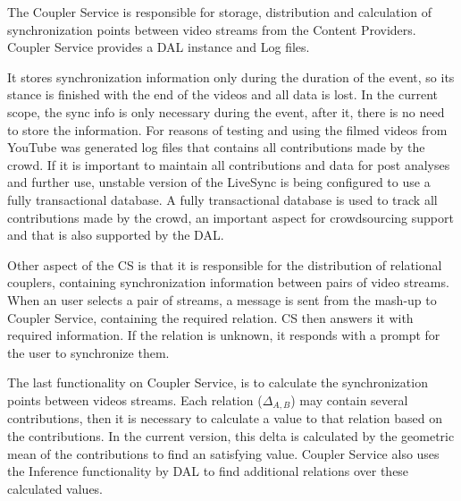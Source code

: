 The Coupler Service is responsible for storage, distribution and calculation of synchronization points between video streams from the Content Providers. Coupler Service provides a DAL instance and Log files. 







It stores synchronization information only during the duration of the event, so its stance is finished with the end of the videos and all data is lost. In the current scope, the sync info is only necessary during the event, after it, there is no need to store the information. For reasons of testing and using the filmed videos from YouTube was generated log files that contains all contributions made by the crowd. If it is important to maintain all contributions and data for post analyses and further use, unstable version of the LiveSync is being configured to use a fully transactional database.  A fully transactional database is used to track all contributions made by the crowd, an important aspect for crowdsourcing support and that is also supported by the DAL.

Other aspect of the CS is that it is responsible for the distribution of relational couplers, containing synchronization information between pairs of video streams. When an user selects a pair of streams, a message is sent from the mash-up to Coupler Service, containing the required relation. CS then answers it with required information. If the relation is unknown, it responds with a prompt for the user to synchronize them.

The last functionality on Coupler Service, is to calculate the synchronization points between videos streams. Each relation ($\Delta_{A,B}$) may contain several contributions, then it is necessary to calculate a value to that relation based on the contributions. In the current version, this delta is calculated by the geometric mean of the contributions to find an satisfying value. Coupler Service also uses the Inference functionality by DAL to find additional relations over these calculated values.

